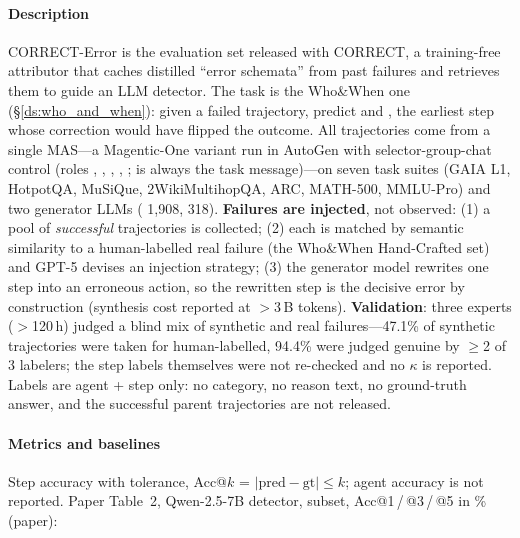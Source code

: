 \paragraph{Description} CORRECT-Error is the evaluation set released with CORRECT, a training-free attributor that caches distilled ``error schemata'' from past failures and retrieves them to guide an LLM detector. The task is the Who\&When one (\S\ref{ds:who_and_when}): given a failed trajectory, predict  and , the earliest step whose correction would have flipped the outcome. All trajectories come from a single MAS---a Magentic-One variant run in AutoGen with selector-group-chat control (roles , , , , ;  is always the  task message)---on seven task suites (GAIA L1, HotpotQA, MuSiQue, 2WikiMultihopQA, ARC, MATH-500, MMLU-Pro) and two generator LLMs ( 1,908,  318). \textbf{Failures are injected}, not observed: (1) a pool of \emph{successful} trajectories is collected; (2) each is matched by semantic similarity to a human-labelled real failure (the Who\&When Hand-Crafted set) and GPT-5 devises an injection strategy; (3) the generator model rewrites one step into an erroneous action, so the rewritten step is the decisive error by construction (synthesis cost reported at $>$3\,B tokens). \textbf{Validation}: three experts ($>$120\,h) judged a blind mix of synthetic and real failures---47.1\% of synthetic trajectories were taken for human-labelled, 94.4\% were judged genuine by $\ge$2 of 3 labelers; the step labels themselves were not re-checked and no $\kappa$ is reported. Labels are agent + step only: no category, no reason text, no ground-truth answer, and the successful parent trajectories are not released.

\paragraph{Metrics and baselines} Step accuracy with tolerance, Acc@$k$ = $|\text{pred}-\text{gt}|\le k$; agent accuracy is not reported. Paper Table~2, Qwen-2.5-7B detector,  subset, Acc@1\,/\,@3\,/\,@5 in \% (paper):

